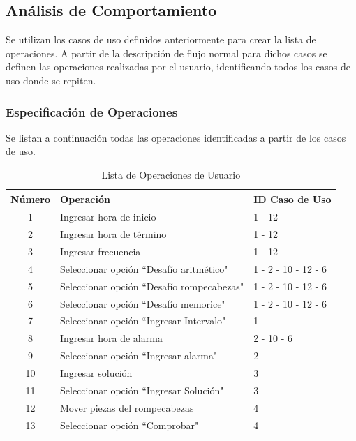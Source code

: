 \subsection{Análisis de Comportamiento}
Se utilizan los casos de uso definidos anteriormente para crear la lista de operaciones. A partir de la descripción de flujo normal para dichos casos se definen las operaciones realizadas por el usuario, identificando todos los casos de uso donde se repiten.

\subsubsection{Especificación de Operaciones}
Se listan a continuación todas las operaciones identificadas a partir de los casos de uso.
\begin{table}[H]
    \centering
    \caption{Lista de Operaciones de Usuario}
    \vspace{5pt}
    \begin{tabular}{| c | l | l |}
        \hline
        Número & Operación & ID Caso de Uso \\
        \hline
        1 & Ingresar hora de inicio & 1 - 12 \\
        \hline
        2 & Ingresar hora de término & 1 - 12 \\
        \hline
        3 & Ingresar frecuencia & 1 - 12 \\
        \hline
        4 & Seleccionar opción ``Desafío aritmético" & 1 - 2 - 10 - 12 - 6 \\
        \hline
        5 & Seleccionar opción ``Desafío rompecabezas" & 1 - 2 - 10 - 12 - 6 \\
        \hline
        6 & Seleccionar opción ``Desafío memorice" & 1 - 2 - 10 - 12 - 6 \\
        \hline
        7 & Seleccionar opción ``Ingresar Intervalo" & 1 \\
        \hline
        8 & Ingresar hora de alarma & 2 - 10 - 6 \\
        \hline
        9 & Seleccionar opción ``Ingresar alarma" & 2 \\
        \hline
        10 & Ingresar solución & 3 \\
        \hline
        11 & Seleccionar opción ``Ingresar Solución" & 3 \\
        \hline
        12 & Mover piezas del rompecabezas & 4 \\
        \hline
        13 & Seleccionar opción ``Comprobar" & 4 \\

\end{tabular}
\end{table}
